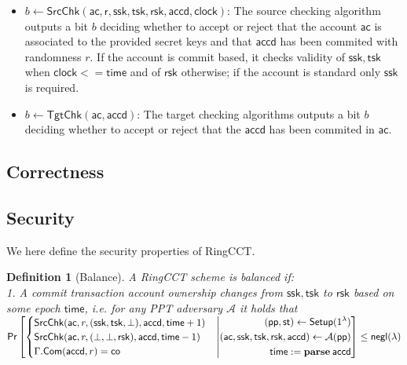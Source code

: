 \documentclass{article}      	%
\newtheorem{definition}{Definition}
\begin{document}
\begin{itemize}
\item $b \gets \mathsf{SrcChk}(\mathsf{ac,r,ssk,tsk,rsk,accd,clock})$: The source checking algorithm outputs a bit $b$ deciding whether to accept or reject that the account $\mathsf{ac}$ is associated to the provided secret keys and that $\mathsf{accd}$ has been commited with randomness $r$. If the account is commit based, it checks validity of $\mathsf{ssk,tsk}$ when $\mathsf{clock} <= \mathsf{time}$ and of $\mathsf{rsk}$ otherwise; if the account is standard only $\mathsf{ssk}$ is required.
\item $b \gets \mathsf{TgtChk}(\mathsf{ac,accd})$: The target checking algorithms outputs a bit $b$ deciding whether to accept or reject that the $\mathsf{accd}$ has been commited in $\mathsf{ac}$. 
\end{itemize}

\subsection{Correctness}

\subsection{Security}
We here define the security properties of RingCCT.

\begin{definition}[Balance] A RingCCT scheme is balanced if: \\
	1. A commit transaction account ownership changes from $\mathsf{ssk}, \mathsf{tsk}$ to $\mathsf{rsk}$ based on some epoch $\mathsf{time}$, i.e. for any PPT adversary $\mathcal{A}$ it holds that \\
$\mathsf{Pr}\left[
    \begin{cases} 
	\mathsf{SrcChk}(\mathsf{ac}, r, (\mathsf{ssk}, \mathsf{tsk}, \perp), \mathsf{accd}, \mathsf{time}+1) \tabularnewline 
	\mathsf{SrcChk}(\mathsf{ac}, r, (\perp, \perp, \mathsf{rsk}), \mathsf{accd}, \mathsf{time}-1) \tabularnewline
        \Gamma.\mathsf{Com}(\mathsf{accd}, r) = \mathsf{co} 
    \end{cases} 
    \middle|(
    \begin{aligned}
	(\mathsf{pp}, \mathsf{st}) \gets \mathsf{Setup}(1^\lambda) \\
	\mathsf{ac}, \mathsf{ssk}, \mathsf{tsk}, \mathsf{rsk}, \mathsf{accd}) \gets \mathcal{A}(\mathsf{pp}) \\
    	\mathsf{time} := \mathbf{parse} \: \mathsf{accd} \\
    \end{aligned}
\right]
\leq \negl
$
\end{definition}
\end{document}
